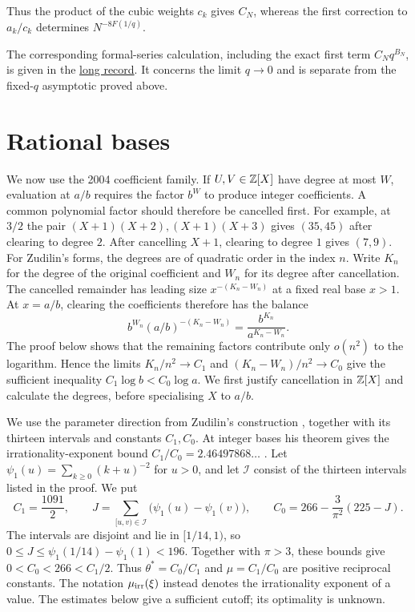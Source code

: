 \documentclass[11pt]{article}
\newcommand{\shortrecordlink}[3]{\href{#1\##2}{#3}}
\begin{document}
Thus the product of the cubic weights $c_k$ gives $C_N$, whereas the
first correction to $a_k/c_k$ determines $N^{-8F(1/q)}$.

The corresponding formal-series calculation, including the exact first
term $C_Nq^{B_N}$, is given in the
\shortrecordlink{erdos1049-rational-base-lambert-reasoning-surface.pdf}
{scope-formal-order}{long record}. It concerns the limit $q\to0$ and is
separate from the fixed-$q$ asymptotic proved above.

\section{Rational bases}
\label{sec:rational-base-irrationality}

We now use the 2004 coefficient family. If $U,V\in\mathbb{Z}[X]$ have degree
at most $W$, evaluation at $a/b$ requires the factor $b^W$ to produce
integer coefficients. A common polynomial factor should therefore be
cancelled first. For example, at $3/2$ the pair
$(X+1)(X+2),(X+1)(X+3)$ gives $(35,45)$ after clearing to degree $2$.
After cancelling $X+1$, clearing to degree $1$ gives $(7,9)$.
For Zudilin's forms, the degrees are of quadratic order in the
index $n$. Write $K_n$ for the degree of the original coefficient
and $W_n$ for its degree after cancellation. The cancelled remainder
has leading size $x^{-(K_n-W_n)}$ at a fixed real base $x>1$.
At $x=a/b$, clearing the coefficients therefore has the balance
\begin{equation}\label{eq:degree-balance}
 b^{W_n}(a/b)^{-(K_n-W_n)}
 =\frac{b^{K_n}}{a^{K_n-W_n}}.
\end{equation}
The proof below shows that the remaining factors contribute only
$o(n^2)$ to the logarithm. Hence the limits $K_n/n^2\to C_1$ and
$(K_n-W_n)/n^2\to C_0$ give the sufficient inequality
$C_1\log b<C_0\log a$. We first justify cancellation in $\mathbb{Z}[X]$
and calculate the degrees, before specialising $X$ to $a/b$.

We use the parameter direction from Zudilin's construction
\cite[\S5, pp.~161--162]{zudilin2004}, together with its thirteen
intervals and constants $C_1,C_0$. At integer bases his theorem gives
the irrationality-exponent bound $C_1/C_0=2.46497868\ldots$
\cite[Thm.~1, p.~154]{zudilin2004}.
Let $\psi_1(u)=\sum_{k\ge0}(k+u)^{-2}$ for $u>0$, and let
$\mathcal I$ consist of the thirteen intervals listed in the proof.
We put
\begin{equation}\label{eq:threshold-constants}
 C_1=\frac{1091}{2},\qquad
 J=\sum_{[u,v)\in\mathcal I}\bigl(\psi_1(u)-\psi_1(v)\bigr),\qquad
 C_0=266-\frac3{\pi^2}(225-J).
\end{equation}
The intervals are disjoint and lie in $[1/14,1)$, so
$0\le J\le\psi_1(1/14)-\psi_1(1)<196$.
Together with $\pi>3$, these bounds give $0<C_0<266<C_1/2$.
Thus $\theta^*=C_0/C_1$ and $\mu=C_1/C_0$ are positive reciprocal
constants. The notation $\mu_{\rm irr}(\xi)$ instead denotes the
irrationality exponent of a value. The estimates below give a sufficient cutoff; its optimality is unknown.
\end{document}
